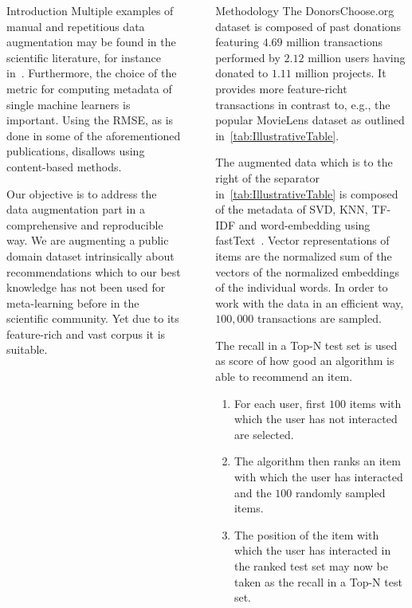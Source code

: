 \documentclass[final]{beamer}
\newcommand{\parvspace}[1]{\vspace{.5em}}  %
\begin{document}
\begin{frame}[t,fragile=singleslide]{}
\begin{columns}[t]
\begin{column}{0.45\textwidth}
\begin{block}{Introduction}
				Multiple examples of manual and repetitious data augmentation may be found in the scientific literature, for instance in~\cite{CUNHA2018128,DBLP:journals/corr/abs-1805-12118,Ekstrand:2012:RFP:2365952.2366002}. Furthermore, the choice of the metric for computing metadata of single machine learners is important. Using the RMSE, as is done in some of the aforementioned publications, disallows using content-based methods.
				\parvspace{}

				Our objective is to address the data augmentation part in a comprehensive and reproducible way. We are augmenting a public domain dataset intrinsically about recommendations which to our best knowledge has not been used for meta-learning before in the scientific community. Yet due to its feature-rich and vast corpus it is suitable.
			\end{block}
		\end{column}

		{
			\color{gray}
			\hspace{-1em}
			\vrule{}
			\hspace{+1em}
		}

		\begin{column}{0.45\textwidth}
			\begin{block}{Methodology}
				The DonorsChoose.org dataset is composed of past donations featuring $4.69$ million transactions performed by $2.12$ million users having donated to $1.11$ million projects. It provides more feature-richt transactions in contrast to, e.g., the popular MovieLens dataset as outlined in~\autoref{tab:IllustrativeTable}.
				\parvspace{}

				The augmented data which is to the right of the separator in~\autoref{tab:IllustrativeTable} is composed of the metadata of SVD, KNN, TF-IDF and word-embedding using fastText~\cite{scikit-learn,rehurek_lrec,DBLP:journals/corr/BojanowskiGJM16}. Vector representations of items are the normalized sum of the vectors of the normalized embeddings of the individual words. In order to work with the data in an efficient way, $100,000$ transactions are sampled.
				\parvspace{}

				The recall in a Top-N test set is used as score of how good an algorithm is able to recommend an item.
				\begin{enumerate}
					\item For each user, first $100$ items with which the user has not interacted are selected.
					\item The algorithm then ranks an item with which the user has interacted and the $100$ randomly sampled items.
					\item The position of the item with which the user has interacted in the ranked test set may now be taken as the recall in a Top-N test set.
				\end{enumerate}
			\end{block}
		\end{column}
	\end{columns}


\end{frame}
\end{document}
